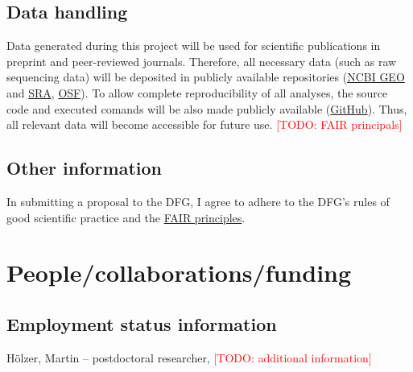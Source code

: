 \documentclass[american,firsttime]{dfgproposal}
\newcommand{\todo}[1]{\xspace{\textcolor{red}{[TODO: #1]}}\xspace}
\begin{document}
	
	\subsection{Data handling}
	Data generated during this project will be used for scientific publications in
	preprint and peer-reviewed journals. Therefore, all necessary data (such as raw
	sequencing data) will be deposited in publicly available repositories
	(\href{https://www.ncbi.nlm.nih.gov/geo/}{NCBI GEO} and
	\href{https://www.ncbi.nlm.nih.gov/sra}{SRA}, \href{https://osf.io/}{OSF}). To
	allow complete reproducibility of all analyses, the source code and executed
	comands will be also made publicly available
	(\href{https://github.com/}{GitHub}).  Thus, all relevant data will become
	accessible for future use. 
	\todo{FAIR principals}
	
	\subsection{Other information}
	In submitting a proposal to the DFG, I agree to adhere to the DFG's rules of good scientific practice and the \href{https://www.nature.com/articles/sdata201618}{FAIR principles}.
	
	
	
	\section{People/collaborations/funding}
	
	\subsection{Employment status information}
	H\"olzer, Martin -- postdoctoral researcher, \todo{additional information}
	
\end{document}
